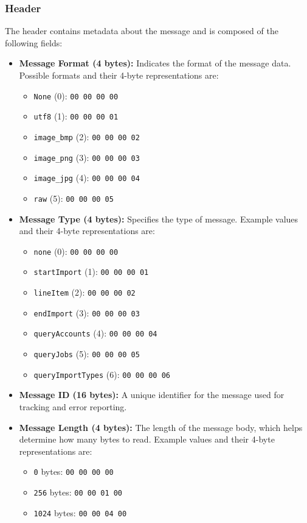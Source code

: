 \documentclass{memoir}
\begin{document}
	\subsubsection{Header}
	The header contains metadata about the message and is composed of the following fields:
	\begin{itemize}
		\item \textbf{Message Format (4 bytes):} Indicates the format of the message data. Possible formats and their 4-byte representations are:
		\begin{itemize}
			\item \texttt{None} (0): \texttt{00 00 00 00}
			\item \texttt{utf8} (1): \texttt{00 00 00 01}
			\item \texttt{image\_bmp} (2): \texttt{00 00 00 02}
			\item \texttt{image\_png} (3): \texttt{00 00 00 03}
			\item \texttt{image\_jpg} (4): \texttt{00 00 00 04}
			\item \texttt{raw} (5): \texttt{00 00 00 05}
		\end{itemize}
		\item \textbf{Message Type (4 bytes):} Specifies the type of message. Example values and their 4-byte representations are:
		\begin{itemize}
			\item \texttt{none} (0): \texttt{00 00 00 00}
			\item \texttt{startImport} (1): \texttt{00 00 00 01}
			\item \texttt{lineItem} (2): \texttt{00 00 00 02}
			\item \texttt{endImport} (3): \texttt{00 00 00 03}
			\item \texttt{queryAccounts} (4): \texttt{00 00 00 04}
			\item \texttt{queryJobs} (5): \texttt{00 00 00 05}
			\item \texttt{queryImportTypes} (6): \texttt{00 00 00 06}
		\end{itemize}
		\item \textbf{Message ID (16 bytes):} A unique identifier for the message used for tracking and error reporting.
		\item \textbf{Message Length (4 bytes):} The length of the message body, which helps determine how many bytes to read. Example values and their 4-byte representations are:
		\begin{itemize}
			\item \texttt{0} bytes: \texttt{00 00 00 00}
			\item \texttt{256} bytes: \texttt{00 00 01 00}
			\item \texttt{1024} bytes: \texttt{00 00 04 00}
		\end{itemize}
	\end{itemize}
	
\end{document}
